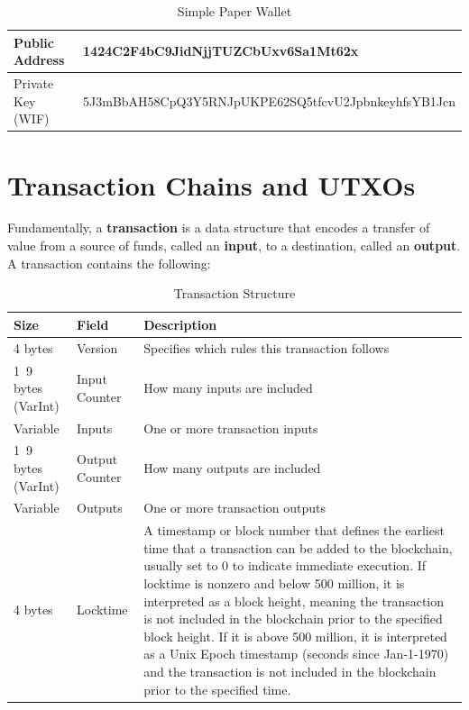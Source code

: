 \documentclass{article}
\begin{document}
    \begin{table}[H]
    \centering
    \begin{tabular}{|l|l|}
    \hline
    Public Address & 1424C2F4bC9JidNjjTUZCbUxv6Sa1Mt62x \\
    \hline
    Private Key (WIF) & 5J3mBbAH58CpQ3Y5RNJpUKPE62SQ5tfcvU2JpbnkeyhfsYB1Jcn \\
    \hline
    \end{tabular}
    \caption{Simple Paper Wallet}
    \end{table}

\section{Transaction Chains and UTXOs}

    Fundamentally, a \textbf{transaction} is a data structure that encodes a transfer of value from a source of funds, called an \textbf{input}, to a destination, called an \textbf{output}. A transaction contains the following:

    \begin{table}[H]
    \centering
    \begin{tabular}{|l|l|l|}
    \hline
    Size & Field & Description \\
    \hline
    4 bytes & Version & Specifies which rules this transaction follows \\
    1~9 bytes (VarInt) & Input Counter & How many inputs are included \\
    Variable & Inputs & One or more transaction inputs \\
    1~9 bytes (VarInt) & Output Counter & How many outputs are included \\
    Variable & Outputs & One or more transaction outputs \\
    4 bytes & Locktime & A timestamp or block number that defines the earliest time that a transaction can be added to the blockchain, usually set to 0 to indicate immediate execution. If locktime is nonzero and below 500 million, it is interpreted as a block height, meaning the transaction is not included in the blockchain prior to the specified block height. If it is above 500 million, it is interpreted as a Unix Epoch timestamp (seconds since Jan-1-1970) and the transaction is not included in the blockchain prior to the specified time. \\
    \hline
    \end{tabular}
    \caption{Transaction Structure}
    \end{table}
\end{document}
